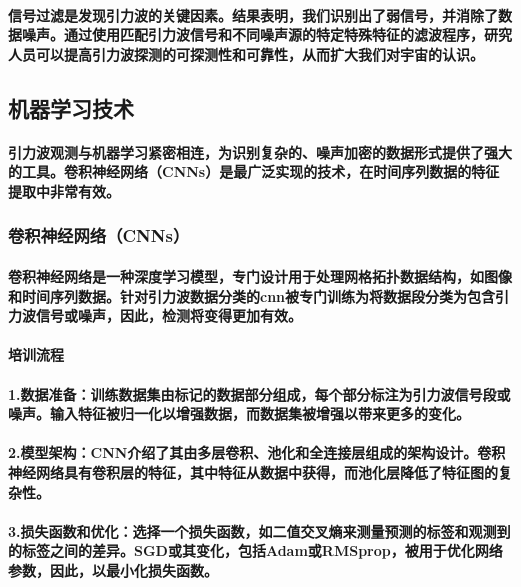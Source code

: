 \documentclass{article}
\begin{document}
\paragraph{信号过滤是发现引力波的关键因素。结果表明，我们识别出了弱信号，并消除了数据噪声。通过使用匹配引力波信号和不同噪声源的特定特殊特征的滤波程序，研究人员可以提高引力波探测的可探测性和可靠性，从而扩大我们对宇宙的认识。}
\subsection{机器学习技术}
\paragraph{引力波观测与机器学习紧密相连，为识别复杂的、噪声加密的数据形式提供了强大的工具。卷积神经网络（CNNs）是最广泛实现的技术，在时间序列数据的特征提取中非常有效。}
\subsubsection{卷积神经网络（CNNs）}
\paragraph{卷积神经网络是一种深度学习模型，专门设计用于处理网格拓扑数据结构，如图像和时间序列数据。针对引力波数据分类的cnn被专门训练为将数据段分类为包含引力波信号或噪声，因此，检测将变得更加有效。}
\paragraph{培训流程}
\paragraph{1.数据准备：训练数据集由标记的数据部分组成，每个部分标注为引力波信号段或噪声。输入特征被归一化以增强数据，而数据集被增强以带来更多的变化。}
\paragraph{2.模型架构：CNN介绍了其由多层卷积、池化和全连接层组成的架构设计。卷积神经网络具有卷积层的特征，其中特征从数据中获得，而池化层降低了特征图的复杂性。}
\paragraph{3.损失函数和优化：选择一个损失函数，如二值交叉熵来测量预测的标签和观测到的标签之间的差异。SGD或其变化，包括Adam或RMSprop，被用于优化网络参数，因此，以最小化损失函数。}
\end{document}
